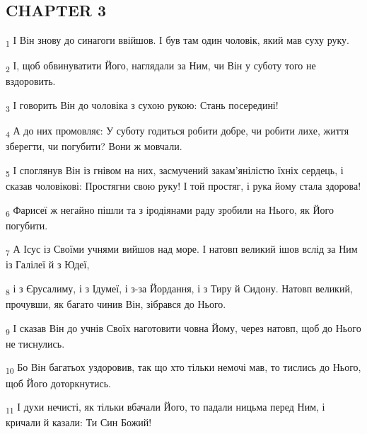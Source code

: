 \subsection{CHAPTER 3}
\begin{tcolorbox}
\textsubscript{1} І Він знову до синагоги ввійшов. І був там один чоловік, який мав суху руку.
\end{tcolorbox}
\begin{tcolorbox}
\textsubscript{2} І, щоб обвинуватити Його, наглядали за Ним, чи Він у суботу того не вздоровить.
\end{tcolorbox}
\begin{tcolorbox}
\textsubscript{3} І говорить Він до чоловіка з сухою рукою: Стань посередині!
\end{tcolorbox}
\begin{tcolorbox}
\textsubscript{4} А до них промовляє: У суботу годиться робити добре, чи робити лихе, життя зберегти, чи погубити? Вони ж мовчали.
\end{tcolorbox}
\begin{tcolorbox}
\textsubscript{5} І споглянув Він із гнівом на них, засмучений закам'янілістю їхніх сердець, і сказав чоловікові: Простягни свою руку! І той простяг, і рука йому стала здорова!
\end{tcolorbox}
\begin{tcolorbox}
\textsubscript{6} Фарисеї ж негайно пішли та з іродіянами раду зробили на Нього, як Його погубити.
\end{tcolorbox}
\begin{tcolorbox}
\textsubscript{7} А Ісус із Своїми учнями вийшов над море. І натовп великий ішов вслід за Ним із Галілеї й з Юдеї,
\end{tcolorbox}
\begin{tcolorbox}
\textsubscript{8} і з Єрусалиму, і з Ідумеї, і з-за Йордання, і з Тиру й Сидону. Натовп великий, прочувши, як багато чинив Він, зібрався до Нього.
\end{tcolorbox}
\begin{tcolorbox}
\textsubscript{9} І сказав Він до учнів Своїх наготовити човна Йому, через натовп, щоб до Нього не тиснулись.
\end{tcolorbox}
\begin{tcolorbox}
\textsubscript{10} Бо Він багатьох уздоровив, так що хто тільки немочі мав, то тислись до Нього, щоб Його доторкнутись.
\end{tcolorbox}
\begin{tcolorbox}
\textsubscript{11} І духи нечисті, як тільки вбачали Його, то падали ницьма перед Ним, і кричали й казали: Ти Син Божий!
\end{tcolorbox}
